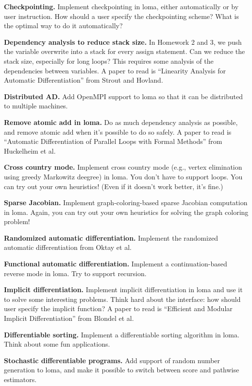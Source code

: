 \textbf{Checkpointing.} 
Implement checkpointing in loma, either automatically or by user instruction. 
How should a user specify the checkpointing scheme? What is the optimal way to do it automatically?

\textbf{Dependency analysis to reduce stack size.} In Homework 2 and 3, we push the variable overwrite into a stack for every assign statement. Can we reduce the stack size, especially for long loops? This requires some analysis of the dependencies between variables. A paper to read is ``Linearity Analysis for Automatic Differentiation'' from Strout and Hovland.

\textbf{Distributed AD.} Add OpenMPI support to loma so that it can be distributed to multiple machines.

\textbf{Remove atomic add in loma.} Do as much dependency analysis as possible, and remove atomic add when it's possible to do so safely. A paper to read is ``Automatic Differentiation of Parallel Loops with Formal Methods'' from Huckelheim et al.

\textbf{Cross country mode.} Implement cross country mode (e.g., vertex elimination using greedy Markowitz deegree) in loma. You don't have to support loops. You can try out your own heuristics! (Even if it doesn't work better, it's fine.)

\textbf{Sparse Jacobian.} Implement graph-coloring-based sparse Jacobian computation in loma. Again, you can try out your own heuristics for solving the graph coloring problem!

\textbf{Randomized automatic differentiation.} Implement the randomized automatic differentiation from Oktay et al.

\textbf{Functional automatic differentiation.} Implement a continuation-based reverse mode in loma. Try to support recursion.

\textbf{Implicit differentiation.} Implement implicit differentiation in loma and use it to solve some interesting problems. Think hard about the interface: how should user specify the implicit function? A paper to read is ``Efficient and Modular Implicit Differentiation'' from Blondel et al.

\textbf{Differentiable sorting.} Implement a differentiable sorting algorithm in loma. Think about some fun applications.

\textbf{Stochastic differentiable programs.} Add support of random number generation to loma, and make it possible to switch between score and pathwise estimators.

